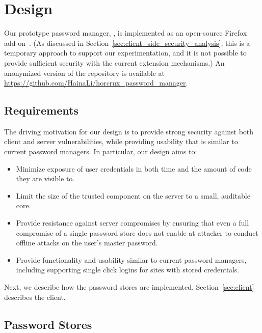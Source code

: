 \section{Design} \label{horcrux}

Our prototype password manager, \SecPass, is implemented as an open-source Firefox add-on~\cite{firefox_addon}.  (As discussed in Section~\ref{sec:client_side_security_analysis}, this is a temporary approach to support our experimentation, and it is not possible to provide sufficient security with the current extension mechanisms.)
An anonymized version of the repository is available at {\url{https://github.com/HainaLi/horcrux_password_manager}}. %


\subsection{Requirements}

The driving motivation for our design is to provide strong security against both client and server vulnerabilities, while providing usability that is similar to current password managers.  In particular, our design aims to:
\begin{itemize}
\item Minimize exposure of user credentials in both time and the amount of code they are visible to.
\item Limit the size of the trusted component on the server to a small, auditable core.
\item Provide resistance against server compromises by ensuring that even a full compromise of a single password store does not enable at attacker to conduct offline attacks on the user's master password.
\item Provide functionality and usability similar to current password managers, including supporting single click logins for sites with stored credentials. 
\end{itemize}
Next, we describe how the password stores are implemented. Section~\ref{sec:client} describes the client.

\subsection{Password Stores}
\label{sec:password_stores}

